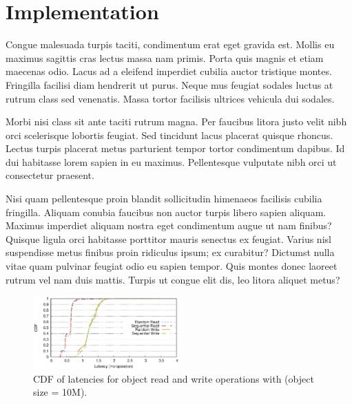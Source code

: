 \section{Implementation}
\label{sec:implementation}

Congue malesuada turpis taciti, condimentum erat eget gravida est. Mollis eu
maximus sagittis cras lectus massa nam primis. Porta quis magnis et etiam
maecenas odio. Lacus ad a eleifend imperdiet cubilia auctor tristique montes.
Fringilla facilisi diam hendrerit ut purus. Neque mus feugiat sodales luctus at
rutrum class sed venenatis. Massa tortor facilisis ultrices vehicula dui
sodales.

Morbi nisi class sit ante taciti rutrum magna. Per faucibus litora justo velit
nibh orci scelerisque lobortis feugiat. Sed tincidunt lacus placerat quisque
rhoncus. Lectus turpis placerat metus parturient tempor tortor condimentum
dapibus. Id dui habitasse lorem sapien in eu maximus. Pellentesque vulputate
nibh orci ut consectetur praesent.

Nisi quam pellentesque proin blandit sollicitudin himenaeos facilisis cubilia
fringilla. Aliquam conubia faucibus non auctor turpis libero sapien aliquam.
Maximus imperdiet aliquam nostra eget condimentum augue ut nam finibus? Quisque
ligula orci habitasse porttitor mauris senectus ex feugiat. Varius nisl
suspendisse metus finibus proin ridiculus ipsum; ex curabitur? Dictumst nulla
vitae quam pulvinar feugiat odio eu sapien tempor. Quis montes donec laoreet
rutrum vel nam duis mattis. Turpis ut congue elit dis, leo litora aliquet
metus?

\begin{figure}[t]
    \centering
    \includegraphics[width=0.5\textwidth]{figs/latency-cdf}
    \caption{CDF of latencies for object read and write operations with \System (object size = 10M).}
    \label{fig:latency-cdf}
\end{figure}
